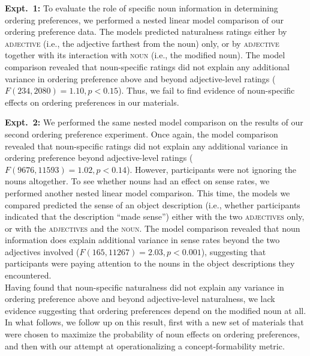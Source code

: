 \documentclass[12pt]{article}
\begin{document}
\textbf{Expt.~1:} To evaluate the role of specific noun information in determining ordering preferences, we performed a nested linear model comparison of our ordering preference data. The models predicted naturalness ratings either by \textsc{adjective} (i.e., the adjective farthest from the noun) only, or by \textsc{adjective} together with its interaction with \textsc{noun} (i.e., the modified noun).
The model comparison revealed that noun-specific ratings did not explain any additional variance in ordering preference above and beyond adjective-level ratings ($F(234,2080) = 1.10, p < 0.15$).  Thus, we fail to find evidence of noun-specific effects on ordering preferences in our materials.

\textbf{Expt.~2:} We performed the same nested model comparison on the results of our second ordering preference experiment. Once again, the model comparison revealed that noun-specific ratings did not explain any additional variance in ordering preference 
beyond adjective-level ratings ($F(9676,11593) = 1.02, p < 0.14$). However, participants were not ignoring the nouns altogether. To see whether nouns had an effect on sense rates, we performed another nested linear model comparison. This time, the models we compared predicted the sense of an object description (i.e., whether participants indicated that the description ``made sense'') either with the two \textsc{adjectives} only, or with the \textsc{adjectives} and the \textsc{noun}. The model comparison revealed that noun information does explain additional variance in sense rates beyond the two adjectives involved ($F(165,11267)=2.03, p<0.001$), suggesting that participants were paying attention to the nouns in the object descriptions they encountered.\\

\noindent Having found that noun-specific naturalness did not explain any variance in ordering preference above and beyond adjective-level naturalness, we lack evidence suggesting that ordering preferences depend on the modified noun at all. %
In what follows, we follow up on this result, first with a new set of materials that were chosen to maximize the probability of noun effects on ordering preferences, and then with our attempt at operationalizing a concept-formability metric.
\end{document}
